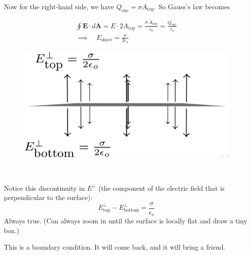 \documentclass{article}
\begin{document}
Now for the right-hand side, we have $Q_{\text{enc}} = \sigma A_{\text{top}}$. So Gauss's law becomes

\begin{gather*}
    \oint \bm{E} \cdot d\bm{A} = E \cdot 2 A_{\text{top}} = \frac{\sigma\ A_{\text{top}}}{\epsilon_o} = \frac{Q_{\text{enc}}}{\epsilon_o} \\
    \implies \quad \boxed{E_{\text{sheet}} = \frac{\sigma}{2\epsilon_o}}
\end{gather*}

\begin{minipage}{0.4\textwidth}
\begin{figure}[H]
\centering
\includegraphics[width=\textwidth]{figures/2l9.png}
\end{figure}
\end{minipage}
~
\begin{minipage}{0.55\textwidth}
Notice this discontinuity in $E^{\perp}$ (the component of the electric field that is perpendicular to the surface):
\begin{equation*}
    \boxed{E_{\text{top}}^{\perp} - E_{\text{bottom}}^{\perp} = \frac{\sigma}{\epsilon_o}}
\end{equation*}
Always true. (Can always zoom in until the surface is locally flat and draw a tiny box.)
\end{minipage}

\vspace{1em}

\begin{center}
This is a boundary condition. It will come back, and it will bring a friend.
\end{center}
\end{document}
